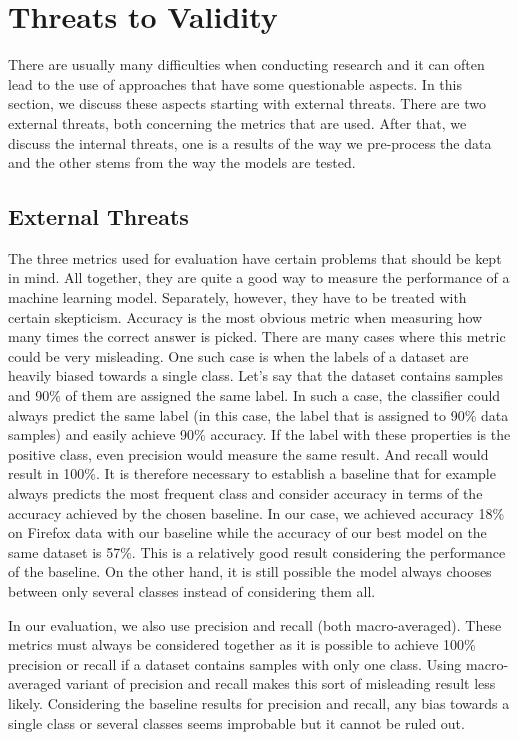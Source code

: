 \section{Threats to Validity}

There are usually many difficulties when conducting research and it can often lead to the use of approaches that have some questionable aspects. In this section, we discuss these aspects starting with external threats. There are two external threats, both concerning the metrics that are used. After that, we discuss the internal threats, one is a results of the way we pre-process the data and the other stems from the way the models are tested.

\subsection{External Threats}

The three metrics used for evaluation have certain problems that should be kept in mind. All together, they are quite a good way to measure the performance of a machine learning model. Separately, however, they have to be treated with certain skepticism. Accuracy is the most obvious metric when measuring how many times the correct answer is picked. There are many cases where this metric could be very misleading. One such case is when the labels of a dataset are heavily biased towards a single class. Let's say that the dataset contains samples and 90\% of them are assigned the same label. In such a case, the classifier could always predict the same label (in this case, the label that is assigned to 90\% data samples) and easily achieve 90\% accuracy. If the label with these properties is the positive class, even precision would measure the same result. And recall would result in 100\%. It is therefore necessary to establish a baseline that for example always predicts the most frequent class and consider accuracy in terms of the accuracy achieved by the chosen baseline. In our case, we achieved accuracy 18\% on Firefox data with our baseline while the accuracy of our best model on the same dataset is 57\%. This is a relatively good result considering the performance of the baseline. On the other hand, it is still possible the model always chooses between only several classes instead of considering them all.

In our evaluation, we also use precision and recall (both macro-averaged). These metrics must always be considered together as it is possible to achieve 100\% precision or recall if a dataset contains samples with only one class. Using macro-averaged variant of precision and recall makes this sort of misleading result less likely. Considering the baseline results for precision and recall, any bias towards a single class or several classes seems improbable but it cannot be ruled out.

